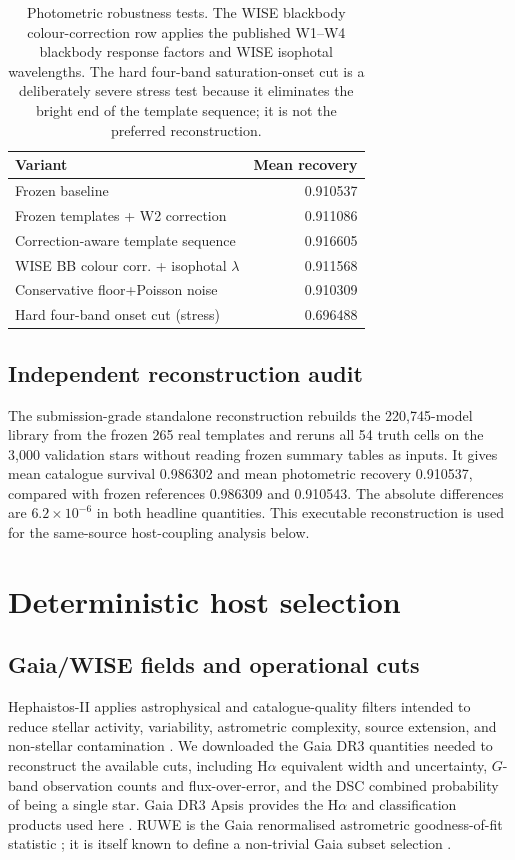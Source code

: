 \documentclass[fleqn,usenatbib]{mnras}
\begin{document}
\begin{table}
\centering
\caption{Photometric robustness tests. The WISE blackbody colour-correction row applies the published W1--W4 blackbody response factors and WISE isophotal wavelengths. The hard four-band saturation-onset cut is a deliberately severe stress test because it eliminates the bright end of the template sequence; it is not the preferred reconstruction.}
\label{tab:photrobust}
\begin{tabular}{lr}
\toprule
Variant & Mean recovery\\
\midrule
Frozen baseline & 0.910537\\
Frozen templates + W2 correction & 0.911086\\
Correction-aware template sequence & 0.916605\\
WISE BB colour corr. + isophotal $\lambda$ & 0.911568\\
Conservative floor+Poisson noise & 0.910309\\
Hard four-band onset cut (stress) & 0.696488\\
\bottomrule
\end{tabular}
\end{table}

\subsection{Independent reconstruction audit}

The submission-grade standalone reconstruction rebuilds the 220,745-model library from the frozen 265 real templates and reruns all 54 truth cells on the 3,000 validation stars without reading frozen summary tables as inputs. It gives mean catalogue survival 0.986302 and mean photometric recovery 0.910537, compared with frozen references 0.986309 and 0.910543. The absolute differences are $6.2\times10^{-6}$ in both headline quantities. This executable reconstruction is used for the same-source host-coupling analysis below.

\section{Deterministic host selection}
\label{sec:hostcuts}

\subsection{Gaia/WISE fields and operational cuts}

Hephaistos-II applies astrophysical and catalogue-quality filters intended to reduce stellar activity, variability, astrometric complexity, source extension, and non-stellar contamination \citep{Suazo2024}. We downloaded the Gaia DR3 quantities needed to reconstruct the available cuts, including H$\alpha$ equivalent width and uncertainty, $G$-band observation counts and flux-over-error, and the DSC combined probability of being a single star. Gaia DR3 Apsis provides the H$\alpha$ and classification products used here \citep{Creevey2023}. RUWE is the Gaia renormalised astrometric goodness-of-fit statistic \citep{Lindegren2021}; it is itself known to define a non-trivial Gaia subset selection \citep{EverallBoubert2022}.
\end{document}
